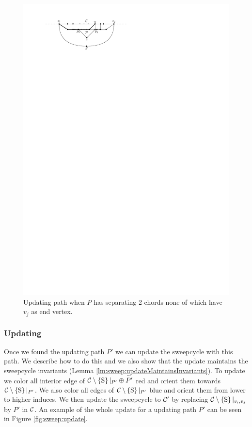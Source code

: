     \begin{figure}[b]
      \centering
      \includegraphics[scale=1]{unifiedAlgo/img/sweep/free2chord}
      \caption{Updating path when $P$ has separating 2-chords none of which have $v_j$ as end vertex.}
      \label{fig:sweep:free2chord}
    \end{figure}

\subsubsection{Updating}
  \label{sss:sweep:update}
  Once we found the updating path $P'$ we can update the sweepcycle with this path.
  We describe how to do this and we also show that the update maintains the sweepcycle invariants (Lemma \ref{lm:sweep:updateMaintainsInvariants}).
  To update we color all interior edge of $\mathcal{C} \setminus \left\lbrace {\mathrm{S}} \right\rbrace|_{P'} \oplus \accentset{\leftharpoonup}{P'}$ red and orient them towards $\mathcal{C} \setminus \left\lbrace {\mathrm{S}} \right\rbrace|_{P'}$.
  We also color all edges of $\mathcal{C} \setminus \left\lbrace {\mathrm{S}} \right\rbrace|_{P'}$  blue and orient them from lower to higher induces.
  We then update the sweepcycle to $\mathcal{C}'$ by replacing $\mathcal{C} \setminus \left\lbrace {\mathrm{S}} \right\rbrace|_{v_i,v_j}$ by $P'$ in $\mathcal{C}$.
  An example of the whole update for a updating path $P'$ can be seen in Figure \ref{fig:sweep:update}.

